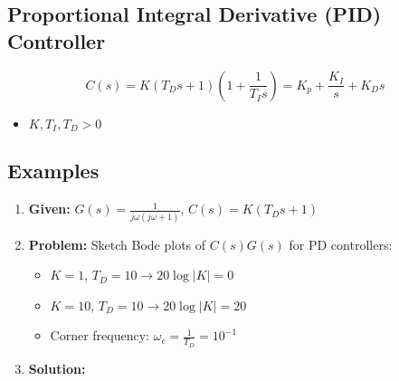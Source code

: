 \subsection{Proportional Integral Derivative (PID) Controller}
\begin{definition}
    \begin{equation}
        C(s) = K(T_D s + 1)\left(1 + \frac{1}{T_I s}\right) = K_p + \frac{K_I}{s} + K_D s
    \end{equation}
    \begin{itemize}
        \item $K,T_I,T_D >0$ 
    \end{itemize}
\end{definition}

\subsection{Examples}
\begin{example}
    \begin{enumerate}
        \item \textbf{Given:} $G(s) = \frac{1}{j \omega (j \omega + 1)}$, $C(s) = K(T_D s + 1)$
        \item \textbf{Problem:} Sketch Bode plots of $C(s)G(s)$ for PD controllers: 
        \begin{itemize}
            \item $K = 1$, $T_D = 10 \rightarrow 20 \log |K| = 0$
            \item $K = 10$, $T_D = 10 \rightarrow 20 \log |K| = 20$
            \item Corner frequency: $\omega_c = \frac{1}{T_D} = 10^{-1}$
        \end{itemize}
        \item \textbf{Solution:} 
    \end{enumerate}
\end{example}




